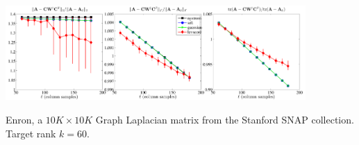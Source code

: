 \documentclass[xcolor=x11names,compress,ignorenonframetext,10pt]{beamer}
\renewcommand{\(}{\begin{columns}}
\renewcommand{\)}{\end{columns}}
\newcommand{\<}[1]{\begin{column}{#1}}
\renewcommand{\>}{\end{column}}
\begin{document}
\begin{frame}
 
  \centerline{\includegraphics[width=4.5in, keepaspectratio=true]{figures/spsd/Enronrank60exact-methods-nonfixed-rank-errors-range}}
 Enron, a $10K \times 10K$ Graph Laplacian matrix from the Stanford SNAP collection. Target
 rank $k = 60.$ 
\end{frame}
% 
% 
% 
% 
\end{document}
